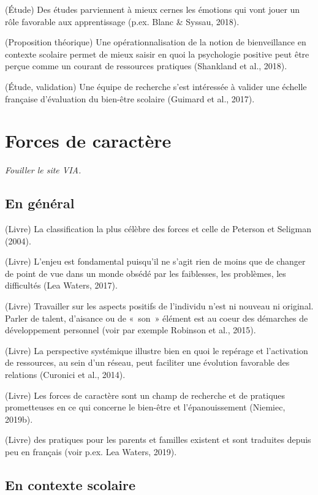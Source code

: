\documentclass[
  french,
]{article}
\begin{document}
(Étude) Des études parviennent à mieux cernes les émotions qui vont jouer un rôle favorable aux apprentissage (p.ex. Blanc \& Syssau, 2018).

(Proposition théorique) Une opérationnalisation de la notion de bienveillance en contexte scolaire permet de mieux saisir en quoi la psychologie positive peut être perçue comme un courant de ressources pratiques (Shankland et al., 2018).

(Étude, validation) Une équipe de recherche s'est intéressée à valider une échelle française d'évaluation du bien-être scolaire (Guimard et al., 2017).

\hypertarget{forces-de-caractuxe8re}{%
\section{Forces de caractère}\label{forces-de-caractuxe8re}}

\emph{Fouiller le site VIA.}

\hypertarget{en-guxe9nuxe9ral}{%
\subsection{En général}\label{en-guxe9nuxe9ral}}

(Livre) La classification la plus célèbre des forces et celle de Peterson et Seligman (2004).

(Livre) L'enjeu est fondamental puisqu'il ne s'agit rien de moins que de changer de point de vue dans un monde obsédé par les faiblesses, les problèmes, les difficultés (Lea Waters, 2017).

(Livre) Travailler sur les aspects positifs de l'individu n'est ni nouveau ni original. Parler de talent, d'aisance ou de «~son~» élément est au coeur des démarches de développement personnel (voir par exemple Robinson et al., 2015).

(Livre) La perspective systémique illustre bien en quoi le repérage et l'activation de ressources, au sein d'un réseau, peut faciliter une évolution favorable des relations (Curonici et al., 2014).

(Livre) Les forces de caractère sont un champ de recherche et de pratiques prometteuses en ce qui concerne le bien-être et l'épanouissement (Niemiec, 2019b).

(Livre) des pratiques pour les parents et familles existent et sont traduites depuis peu en français (voir p.ex. Lea Waters, 2019).

\hypertarget{en-contexte-scolaire}{%
\subsection{En contexte scolaire}\label{en-contexte-scolaire}}
\end{document}
